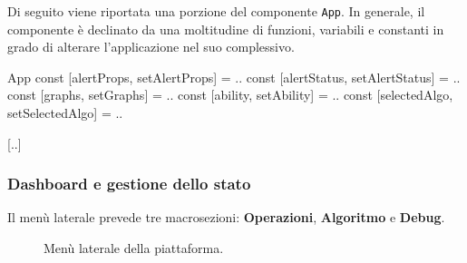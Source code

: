Di seguito viene riportata una porzione del componente \verb|App|. In generale, il componente è declinato da una moltitudine di funzioni, variabili e constanti in grado di alterare l'applicazione nel suo complessivo.

\begin{sexylisting}{App}
const [alertProps, setAlertProps] = ..
const [alertStatus, setAlertStatus] = ..
const [graphs, setGraphs] = ..
const [ability, setAbility] = ..
const [selectedAlgo, setSelectedAlgo] = ..

[..]
\end{sexylisting}

\subsubsection{Dashboard e gestione dello stato}

Il menù laterale prevede tre macrosezioni: \textbf{Operazioni}, \textbf{Algoritmo} e \textbf{Debug}.

\begin{figure}[ht!]
    \centering
    \caption{Menù laterale della piattaforma.}
    \label{fig:esempio}
\end{figure}

